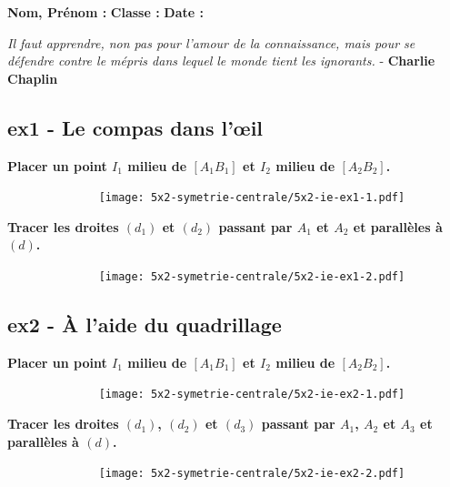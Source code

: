 \documentclass[11pt]{article}
\begin{document}
\newcommand{\Pointilles}[1][3]{%
  \multido{}{#1}{\makebox[\linewidth]{\dotfill}\\[\parskip]
}}

\setlength{\columnseprule}{1pt}

\textbf{Nom, Prénom :} \hspace{8cm} \textbf{Classe :} \hspace{3cm} \textbf{Date :}\\

\begin{center}
  \textit{Il faut apprendre, non pas pour l'amour de la connaissance, mais pour se défendre contre le mépris dans lequel le monde tient les ignorants.}  - \textbf{Charlie Chaplin}
\end{center}

\begin{multicols}{2}
  \subsection*{ex1 - Le compas dans l'œil}

  \textbf{Placer un point $I_1$ milieu de $[A_1 B_1]$ et $I_2$ milieu de $[A_2 B_2]$.}
  \begin{figure}[H]
        \centering
        \texttt{[image: 5x2-symetrie-centrale/5x2-ie-ex1-1.pdf]}
  \end{figure}
  \columnbreak

  \textbf{Tracer les droites $(d_1)$ et $(d_2)$ passant par $A_1$ et $A_2$ et parallèles à $(d)$.}
  \begin{figure}[H]
        \centering
        \texttt{[image: 5x2-symetrie-centrale/5x2-ie-ex1-2.pdf]}
  \end{figure}
\end{multicols}

\subsection*{ex2 - À l'aide du quadrillage}

\begin{multicols}{2}

  \textbf{Placer un point $I_1$ milieu de $[A_1 B_1]$ et $I_2$ milieu de $[A_2 B_2]$.}
  \begin{figure}[H]
        \centering
        \texttt{[image: 5x2-symetrie-centrale/5x2-ie-ex2-1.pdf]}
  \end{figure}
  \columnbreak

  \textbf{Tracer les droites $(d_1)$, $(d_2)$ et $(d_3)$ passant par $A_1$, $A_2$ et $A_3$ et parallèles à $(d)$.}
  \begin{figure}[H]
        \centering
        \texttt{[image: 5x2-symetrie-centrale/5x2-ie-ex2-2.pdf]}
  \end{figure}
\end{multicols}
\end{document}
